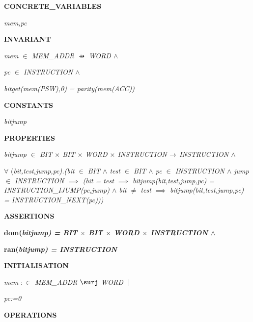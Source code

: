 \begin{sloppypar}
\bf CONCRETE\_VARIABLES

\hspace*{0.10in}\it mem\rm ,\it pc

\bf INVARIANT

\hspace*{0.10in}\it mem $\in$  \it MEM\_ADDR  $\pfun$  \it WORD  $\land$ 

\hspace*{0.10in}\it pc $\in$  \it INSTRUCTION  $\land$ 

\hspace*{0.10in}\it bitget\rm (\it mem\rm (\it PSW\rm )\rm ,\rm 0\rm ) \rm = \it parity\rm (\it mem\rm (\it ACC\rm )\rm )

\bf CONSTANTS

\hspace*{0.10in}\it bitjump

\bf PROPERTIES

\hspace*{0.10in}\it bitjump $\in$  \it BIT $\times$ \it BIT $\times$ \it WORD $\times$ \it INSTRUCTION  $\rightarrow$  \it INSTRUCTION  $\land$ 

\hspace*{0.10in} $\forall$ \rm (\it bit\rm ,\it test\rm ,\it jump\rm ,\it pc\rm )\rm .\rm (\it bit $\in$  \it BIT  $\land$  \it test $\in$  \it BIT  $\land$  \it pc $\in$  \it INSTRUCTION  $\land$  \it jump $\in$  \it INSTRUCTION  $\implies$  \rm (\it bit \rm = \it test  $\implies$  \it bitjump\rm (\it bit\rm ,\it test\rm ,\it jump\rm ,\it pc\rm ) \rm = \it INSTRUCTION\_IJUMP\rm (\it pc\rm ,\it jump\rm )  $\land$  \it bit $\not =$ \it test  $\implies$  \it bitjump\rm (\it bit\rm ,\it test\rm ,\it jump\rm ,\it pc\rm ) \rm = \it INSTRUCTION\_NEXT\rm (\it pc\rm )\rm )\rm )

\bf ASSERTIONS

\hspace*{0.10in}\bf dom\rm (\it bitjump\rm ) \rm = \it BIT $\times$ \it BIT $\times$ \it WORD $\times$ \it INSTRUCTION  $\land$ 

\hspace*{0.10in}\bf ran\rm (\it bitjump\rm ) \rm = \it INSTRUCTION

\bf INITIALISATION

\hspace*{0.10in}\it mem $:\in$  \it MEM\_ADDR  $\surj$  \it WORD  $\mbox{$\mid\mid$}$ 

\hspace*{0.10in}\it pc\rm :=\rm 0

\bf OPERATIONS


\end{sloppypar}
